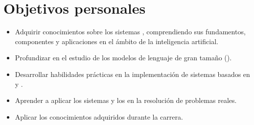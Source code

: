\section{Objetivos personales}

\begin{itemize}
\tightlist
\item Adquirir conocimientos sobre los sistemas , comprendiendo sus fundamentos, componentes y aplicaciones en el ámbito de la inteligencia artificial.
\item Profundizar en el estudio de los modelos de lenguaje de gran tamaño ().
\item Desarrollar habilidades prácticas en la implementación de sistemas basados en  y .
\item Aprender a aplicar los sistemas  y los  en la resolución de problemas reales.
\item Aplicar los conocimientos adquiridos durante la carrera.
\end{itemize}

